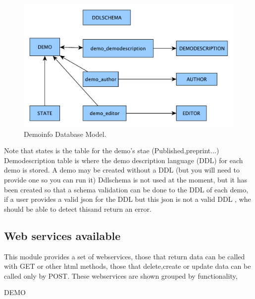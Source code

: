 \begin{figure}[!ht]
\centering
\includegraphics[width=0.5\columnwidth]{demo_info/images/demoinfo_model.pdf}
\caption{Demoinfo Database Model.} 
\label{fi:proxy_example}
\end{figure}

Note that states is the table for the demo's stae (Published,preprint...)
Demodescription table is where the demo description language (DDL) for each demo is stored.
A demo may be created without a DDL (but you will need to provide one so you can run it)
Ddlschema is not used at the moment, but it has been created so that a schema validation can be done to the DDL of each demo, if a user provides a valid json for the DDL but this json is not a valid DDL , whe should be able to detect thisand return an error.

\subsection{Web services available}
This module provides a set of webservices, those that return data can be called with GET or other html methods, those that delete,create or update data can be called only by POST.
These webservices are shown grouped by functionality, 


DEMO

